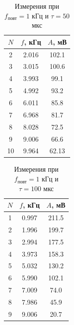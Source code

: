 \documentclass[12pt]{article}
\begin{document}
\begin{enumerate}
		\begin{table}[h!]
			\centering
			\begin{tabular}{|c|c|c|}
			\hline
				$N$ & $f$, кГц & $A$, мВ \\
			\hline
				2 & 2.016 & 102.1 \\
			\hline
				3 & 3.015 & 100.6 \\
			\hline
				4 & 3.993 & 99.1 \\
			\hline
				5 & 4.992 & 93.2 \\
			\hline
				6 & 6.011 & 85.8 \\
			\hline
				7 & 6.968 & 81.7 \\
			\hline
				8 & 8.028 & 72.5 \\
			\hline
				9 & 9.006 & 66.6 \\
			\hline
				10 & 9.964 & 62.13 \\
			\hline
			\end{tabular}
			\caption*{Измерения при $f_\text{повт} = 1$ кГц и $\tau = 50$ мкс}			
		\end{table}
		\begin{table}[h!]
			\centering
			\begin{tabular}{|c|c|c|}
			\hline
				$N$ & $f$, кГц & $A$, мВ \\
			\hline
				1 & 0.997 & 211.5 \\
			\hline
				2 & 1.996 & 199.7 \\
			\hline
				3 & 2.994 & 177.5 \\
			\hline
				4 & 3.973 & 158.3 \\
			\hline
				5 & 5.032 & 130.2 \\
			\hline
				6 & 5.990 & 102.1 \\
			\hline
				7 & 7.009 & 74.0 \\
			\hline
				8 & 7.986 & 45.9 \\
			\hline
				9 & 9.006 & 20.7 \\
			\hline
			\end{tabular}
			\caption*{Измерения при $f_\text{повт} = 1$ кГц и $\tau = 100$ мкс}			
		\end{table}
\end{enumerate}
\end{document}
